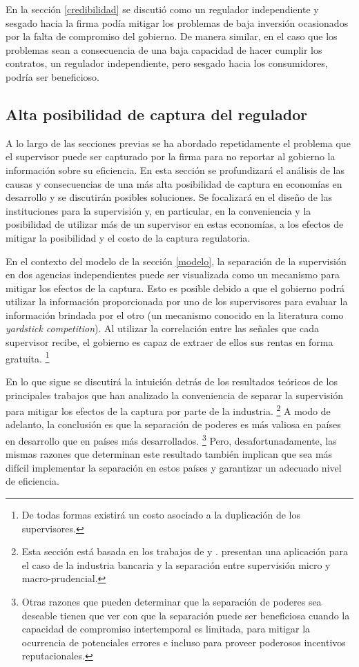 \documentclass[
  12pt,
  spanish,
]{book}
\begin{document}
En la sección \ref{credibilidad} se discutió como un regulador independiente y sesgado hacia la firma podía mitigar los problemas de baja inversión ocasionados por la falta de compromiso del gobierno. De manera similar, en el caso que los problemas sean a consecuencia de una baja capacidad de hacer cumplir los contratos, un regulador independiente, pero sesgado hacia los consumidores, podría ser beneficioso.

\hypertarget{captura}{%
\subsection{Alta posibilidad de captura del regulador}\label{captura}}

A lo largo de las secciones previas se ha abordado repetidamente el problema que el supervisor puede ser capturado por la firma para no reportar al gobierno la información sobre su eficiencia. En esta sección se profundizará el análisis de las causas y consecuencias de una más alta posibilidad de captura en economías en desarrollo y se discutirán posibles soluciones. Se focalizará en el diseño de las instituciones para la supervisión y, en particular, en la conveniencia y la posibilidad de utilizar más de un supervisor en estas economías, a los efectos de mitigar la posibilidad y el costo de la captura regulatoria.

En el contexto del modelo de la sección \ref{modelo}, la separación de la supervisión en dos agencias independientes puede ser visualizada como un mecanismo para mitigar los efectos de la captura. Esto es posible debido a que el gobierno podrá utilizar la información proporcionada por uno de los supervisores para evaluar la información brindada por el otro (un mecanismo conocido en la literatura como \emph{yardstick competition}). Al utilizar la correlación entre las señales que cada supervisor recibe, el gobierno es capaz de extraer de ellos sus rentas en forma gratuita.
\footnote{De todas formas existirá un costo asociado a la duplicación de los supervisores.}

En lo que sigue se discutirá la intuición detrás de los resultados teóricos de los principales trabajos que han analizado la conveniencia de separar la supervisión para mitigar los efectos de la captura por parte de la industria.
\footnote{Esta sección está basada en los trabajos de \citet{Laffont1999} y \citet{Laffont2005}. \citet{Boyer2012} presentan una aplicación para el caso de la industria bancaria y la separación entre supervisión micro y macro-prudencial.}
A modo de adelanto, la conclusión es que la separación de poderes es más valiosa en países en desarrollo que en países más desarrollados.
\footnote{Otras razones que pueden determinar que la separación de poderes sea deseable tienen que ver con que la separación puede ser beneficiosa cuando la capacidad de compromiso intertemporal es limitada, para mitigar la ocurrencia de potenciales errores e incluso para proveer poderosos incentivos reputacionales.}
Pero, desafortunadamente, las mismas razones que determinan este resultado también implican que sea más difícil implementar la separación en estos países y garantizar un adecuado nivel de eficiencia.
\end{document}
